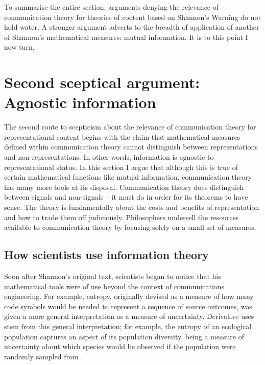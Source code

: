 \documentclass[12pt]{article}
\begin{document}


To summarise the entire section, arguments denying the relevance of communication theory for theories of content based on {\sc Shannon's Warning} do not hold water.
A stronger argument adverts to the breadth of application of another of Shannon's mathematical measures: mutual information.
It is to this point I now turn.


\section{Second sceptical argument: Agnostic information}\label{sec:agnostic}

The second route to scepticism about the relevance of communication theory for representational content begins with the claim that mathematical measures defined within communication theory cannot distinguish between representations and non-representations.
In other words, information is agnostic to representational status.
In this section I argue that although this is true of certain mathematical functions like mutual information, communication theory has many more tools at its disposal.
Communication theory does distinguish between signals and non-signals -- it must do in order for its theorems to have sense.
The theory is fundamentally about the costs and benefits of representation and how to trade them off judiciously.
Philosophers undersell the resources available to communication theory by focusing solely on a small set of measures.

\subsection{How scientists use information theory}\label{subsec:scientists}

Soon after Shannon's original text, scientists began to notice that his mathematical tools were of use beyond the context of communications engineering.
For example, entropy, originally devised as a measure of how many code symbols would be needed to represent a sequence of source outcomes, was given a more general interpretation as a measure of uncertainty.
Derivative uses stem from this general interpretation; for example, the entropy of an ecological population captures an aspect of its population diversity, being a measure of uncertainty about which species would be observed if the population were randomly sampled from \citep{margalef1957information}.
\end{document}
